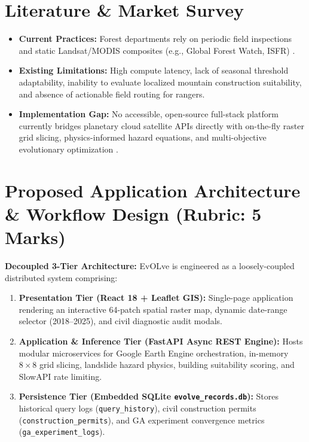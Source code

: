 \documentclass[11pt, a4paper]{article}
\begin{document}
\section{Literature \& Market Survey}
\begin{itemize}[noitemsep, topsep=1pt]
    \item \textbf{Current Practices:} Forest departments rely on periodic field inspections and static Landsat/MODIS composites (e.g., Global Forest Watch, ISFR) \cite{hansen2013high}.
    \item \textbf{Existing Limitations:} High compute latency, lack of seasonal threshold adaptability, inability to evaluate localized mountain construction suitability, and absence of actionable field routing for rangers.
    \item \textbf{Implementation Gap:} No accessible, open-source full-stack platform currently bridges planetary cloud satellite APIs \cite{gorelick2017google, drusch2012sentinel} directly with on-the-fly raster grid slicing, physics-informed hazard equations, and multi-objective evolutionary optimization \cite{deb2002fast}.
\end{itemize}

\section{Proposed Application Architecture \& Workflow Design (Rubric: 5 Marks)}
\textbf{Decoupled 3-Tier Architecture:} EvOLve is engineered as a loosely-coupled distributed system comprising:
\begin{enumerate}[noitemsep, topsep=1pt]
    \item \textbf{Presentation Tier (React 18 + Leaflet GIS):} Single-page application rendering an interactive 64-patch spatial raster map, dynamic date-range selector (2018--2025), and civil diagnostic audit modals.
    \item \textbf{Application \& Inference Tier (FastAPI Async REST Engine):} Hosts modular microservices for Google Earth Engine orchestration, in-memory $8 \times 8$ grid slicing, landslide hazard physics, building suitability scoring, and SlowAPI rate limiting.
    \item \textbf{Persistence Tier (Embedded SQLite \texttt{evolve\_records.db}):} Stores historical query logs (\texttt{query\_history}), civil construction permits (\texttt{construction\_permits}), and GA experiment convergence metrics (\texttt{ga\_experiment\_logs}).
\end{enumerate}
\end{document}
